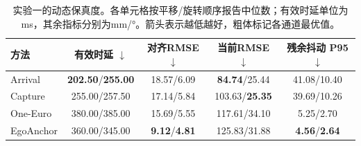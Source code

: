 \begin{table}[t]
\centering
\caption{实验一的动态保真度。各单元格按平移/旋转顺序报告中位数；有效时延单位为ms，其余指标分别为mm/°。箭头表示越低越好，粗体标记各通道最优值。}
\label{tab:exp1-dynamic}
\setlength{\tabcolsep}{2.3pt}
\renewcommand{\arraystretch}{1.10}
\begin{tabular}{@{}lcccc@{}}
\toprule
方法 &
\shortstack{有效时延\\$\downarrow$} &
\shortstack{对齐RMSE\\$\downarrow$} &
\shortstack{当前RMSE\\$\downarrow$} &
\shortstack{残余抖动\\P95 $\downarrow$} \\
\midrule
Arrival   & \textbf{202.50}/\textbf{255.00} & 18.57/6.09 & \textbf{84.74}/25.44 & 41.08/10.40 \\
Capture   & 255.00/257.50 & 17.14/5.84 & 103.63/\textbf{25.35} & 39.69/10.26 \\
One-Euro  & 380.00/385.00 & 15.69/5.55 & 117.61/34.10 & 5.25/2.70 \\
EgoAnchor & 360.00/345.00 & \textbf{9.12}/\textbf{4.81} & 125.83/31.88 & \textbf{4.56}/\textbf{2.64} \\
\bottomrule
\end{tabular}
\end{table}
